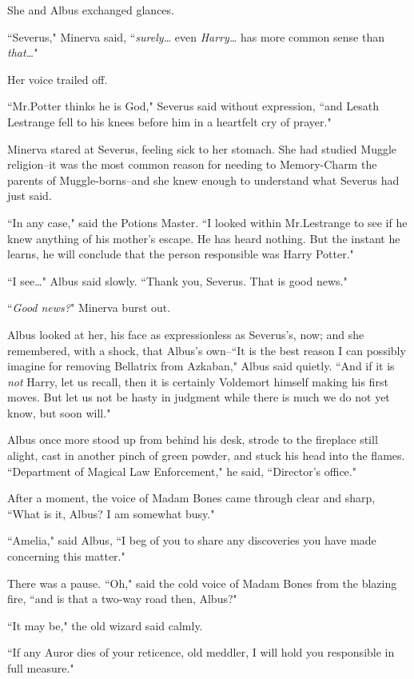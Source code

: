 She and Albus exchanged glances.

``Severus," Minerva said, ``\emph{surely{\ldots}} even \emph{Harry{\ldots}} has more common sense than \emph{that{\ldots}}"

Her voice trailed off.

``Mr.\?Potter thinks he is God," Severus said without expression, ``and Lesath Lestrange fell to his knees before him in a heartfelt cry of prayer."

Minerva stared at Severus, feeling sick to her stomach. She had studied Muggle religion\---it was the most common reason for needing to Memory-Charm the parents of Muggle-borns\---and she knew enough to understand what Severus had just said.

``In any case," said the Potions Master. ``I looked within Mr.\?Lestrange to see if he knew anything of his mother's escape. He has heard nothing. But the instant he learns, he will conclude that the person responsible was Harry Potter."

``I see{\ldots}" Albus said slowly. ``Thank you, Severus. That is good news."

``\emph{Good news?}" Minerva burst out.

Albus looked at her, his face as expressionless as Severus's, now; and she remembered, with a shock, that Albus's own\---``It is the best reason I can possibly imagine for removing Bellatrix from Azkaban," Albus said quietly. ``And if it is \emph{not} Harry, let us recall, then it is certainly Voldemort himself making his first moves. But let us not be hasty in judgment while there is much we do not yet know, but soon will."

Albus once more stood up from behind his desk, strode to the fireplace still alight, cast in another pinch of green powder, and stuck his head into the flames. ``Department of Magical Law Enforcement," he said, ``Director's office."

After a moment, the voice of Madam Bones came through clear and sharp, ``What is it, Albus? I am somewhat busy."

``Amelia," said Albus, ``I beg of you to share any discoveries you have made concerning this matter."

There was a pause. ``Oh," said the cold voice of Madam Bones from the blazing fire, ``and is that a two-way road then, Albus?"

``It may be," the old wizard said calmly.

``If any Auror dies of your reticence, old meddler, I will hold you responsible in full measure."


